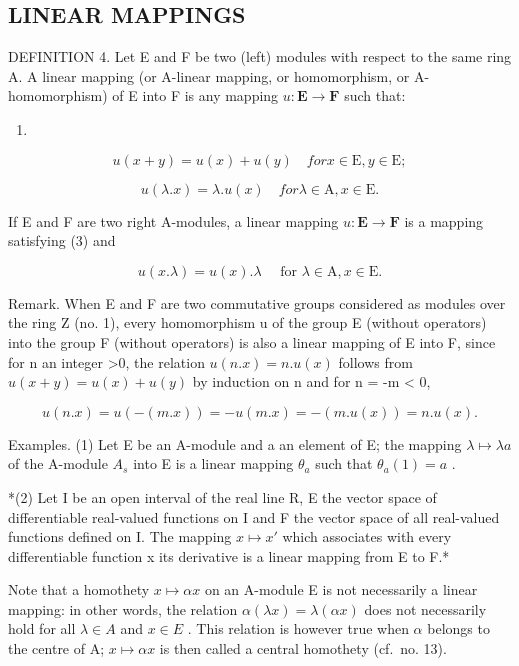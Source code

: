 \subsection{LINEAR MAPPINGS}

DEFINITION 4. Let E and F be two (left) modules with respect to the same ring A. A linear mapping (or A-linear mapping, or homomorphism, or A-homomorphism) of E into F is any mapping \(u: \mathbf{E} \to \mathbf{F}\) such that:

\begin{enumerate}
\def\labelenumi{(\arabic{enumi})}
\setcounter{enumi}{2}
\tightlist
\item
\end{enumerate}

\[
u (x + y) = u (x) + u (y) \quad for x \in \mathrm{E}, y \in \mathrm{E};\tag{4G}
\]

\[
u (\lambda . x) = \lambda . u (x) \quad for \lambda \in \mathrm{A}, x \in \mathrm{E}.
\]

If E and F are two right A-modules, a linear mapping \(u: \mathbf{E} \to \mathbf{F}\) is a mapping satisfying (3) and

\[
u (x . \lambda) = u (x). \lambda \quad \text { for } \lambda \in \mathrm{A}, x \in \mathrm{E}.\tag{4D}
\]

Remark. When E and F are two commutative groups considered as modules over the ring Z (no. 1), every homomorphism u of the group E (without operators) into the group F (without operators) is also a linear mapping of E into F, since for n an integer \textgreater0, the relation \(u(n.x) = n.u(x)\) follows from \(u(x + y) = u(x) + u(y)\) by induction on n and for n = -m \textless{} 0,

\[
u (n. x) = u (- (m. x)) = - u (m. x) = - (m. u (x)) = n. u (x).
\]

Examples. (1) Let E be an A-module and a an element of E; the mapping \(\lambda\mapsto\lambda a\) of the A-module \(A_{s}\) into E is a linear mapping \(\theta_{a}\) such that \(\theta_{a}(1)=a\) .

*(2) Let I be an open interval of the real line R, E the vector space of differentiable real-valued functions on I and F the vector space of all real-valued functions defined on I. The mapping \(x \mapsto x'\) which associates with every differentiable function x its derivative is a linear mapping from E to F.*

Note that a homothety \(x \mapsto \alpha x\) on an A-module E is not necessarily a linear mapping: in other words, the relation \(\alpha(\lambda x) = \lambda(\alpha x)\) does not necessarily hold for all \(\lambda \in A\) and \(x \in E\) . This relation is however true when \(\alpha\) belongs to the centre of A; \(x \mapsto \alpha x\) is then called a central homothety (cf.~no. 13).

